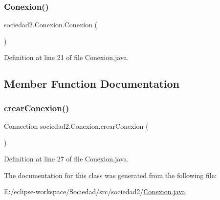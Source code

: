 \subsubsection{\texorpdfstring{Conexion()}{Conexion()}}
{\footnotesize\ttfamily sociedad2.\+Conexion.\+Conexion (\begin{DoxyParamCaption}{ }\end{DoxyParamCaption})}



Definition at line 21 of file Conexion.\+java.



\subsection{Member Function Documentation}
\mbox{\label{classsociedad2_1_1_conexion_ad17987b39ad24b8954e461a5b4412c7b}} 
\subsubsection{\texorpdfstring{crear\+Conexion()}{crearConexion()}}
{\footnotesize\ttfamily Connection sociedad2.\+Conexion.\+crear\+Conexion (\begin{DoxyParamCaption}{ }\end{DoxyParamCaption})}



Definition at line 27 of file Conexion.\+java.



The documentation for this class was generated from the following file\+:\begin{DoxyCompactItemize}
\item 
E\+:/eclipse-\/workspace/\+Sociedad/src/sociedad2/\mbox{\hyperlink{_conexion_8java}{Conexion.\+java}}\end{DoxyCompactItemize}
